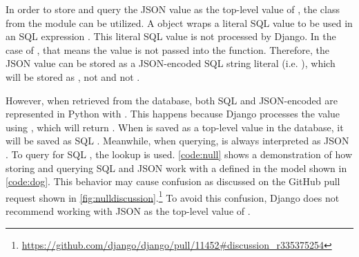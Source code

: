 In order to store and query the JSON  value as the top-level value
of , the  class from the 
module can be utilized. A  object wraps a literal SQL value to be
used in an SQL expression \cite{django:value}. This literal SQL value is not
processed by Django. In the case of , that means the value is
not passed into the  function. Therefore, the JSON
 value can be stored as a JSON-encoded SQL string literal (i.e.
), which will be stored as , not
 and not .

\noindent
\begin{minipage}{\linewidth}

\end{minipage}

\noindent
\begin{minipage}{\linewidth}

\end{minipage}

However, when retrieved from the database, both SQL  and
JSON-encoded  are represented in Python with . This
happens because Django processes the  value using
, which will return . When  is saved
as a top-level value in the database, it will be saved as SQL .
Meanwhile, when querying,  is always interpreted as JSON
. To query for SQL , the  lookup is used.
\autoref{code:null} shows a demonstration of how storing and querying SQL
 and JSON  work with a  defined in the
 model shown in \autoref{code:dog}. This behavior may cause confusion
as discussed on the GitHub pull request shown
in \autoref{fig:nulldiscussion}.\footnote{\url{
	https://github.com/django/django/pull/11452\#discussion\_r335375254}}
To avoid this confusion, Django does not recommend working with JSON
 as the top-level value of .

